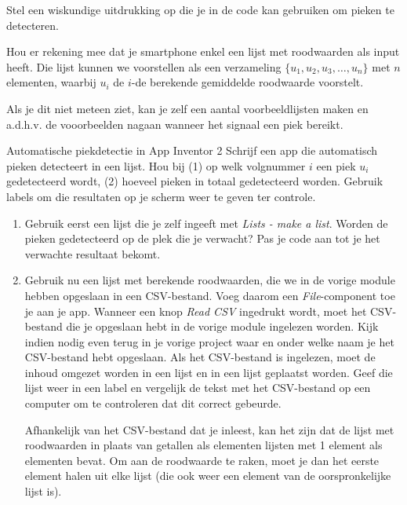 \begin{oef}
	Stel een wiskundige uitdrukking op die je in de code kan gebruiken om pieken te detecteren. 
	
	Hou er rekening mee dat je smartphone enkel een lijst met roodwaarden als input heeft. Die lijst kunnen we voorstellen als een verzameling $\{ u_1, u_2, u_3, \ldots, u_n \}$ met $n$ elementen, waarbij $u_i$ de $i$-de berekende gemiddelde roodwaarde voorstelt.
	
	Als je dit niet meteen ziet, kan je zelf een aantal voorbeeldlijsten maken en a.d.h.v. de vooorbeelden nagaan wanneer het signaal een piek bereikt.
\end{oef}

\begin{opdracht}{Automatische piekdetectie in App Inventor 2}
Schrijf een app die automatisch pieken detecteert in een lijst. Hou bij (1) op welk volgnummer $i$ een piek $u_i$ gedetecteerd wordt, (2) hoeveel pieken in totaal gedetecteerd worden. Gebruik labels om die resultaten op je scherm weer te geven ter controle.

\begin{enumerate}
	\item Gebruik eerst een lijst die je zelf ingeeft met \emph{Lists - make a list}. Worden de pieken gedetecteerd op de plek die je verwacht? Pas je code aan tot je het verwachte resultaat bekomt.
	
	\item Gebruik nu een lijst met berekende roodwaarden, die we in de vorige module hebben opgeslaan in een CSV-bestand. Voeg daarom een \emph{File}-component toe je aan je app. Wanneer een knop \emph{Read CSV} ingedrukt wordt, moet het CSV-bestand die je opgeslaan hebt in de vorige module ingelezen worden. Kijk indien nodig even terug in je vorige project waar en onder welke naam je het CSV-bestand hebt opgeslaan. Als het CSV-bestand is ingelezen, moet de inhoud omgezet worden in een lijst en in een lijst geplaatst worden. Geef die lijst weer in een label en vergelijk de tekst met het CSV-bestand op een computer om te controleren dat dit correct gebeurde. 
	
	\begin{opmerking}
		Afhankelijk van het CSV-bestand dat je inleest, kan het zijn dat de lijst met roodwaarden in plaats van getallen als elementen lijsten met 1 element als elementen bevat. Om aan de roodwaarde te raken, moet je dan het eerste element halen uit elke lijst (die ook weer een element van de oorspronkelijke lijst is).
		

\end{opmerking}
\end{enumerate}
\end{opdracht}
